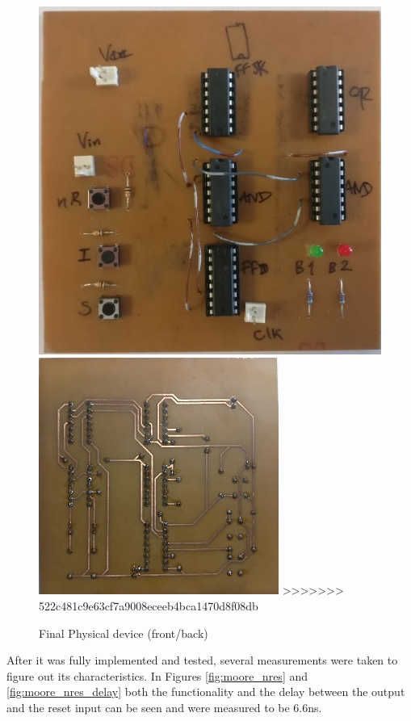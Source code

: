 \begin{figure}[H]
\begin{center}
        \includegraphics[scale=0.5]{./final_build.png}
        \includegraphics[scale=0.85]{./final_back.png}
>>>>>>> 522c481c9e63cf7a9008eceeb4bca1470d8f08db
        \caption{Final Physical device (front/back)}
        \label{fig:moore_build}
    \end{center}
\end{figure}

After it was fully implemented and tested, several measurements were taken to figure out its characteristics.
In Figures \ref{fig:moore_nres} and \ref{fig:moore_nres_delay} both the functionality and the delay between the output
and the reset input can be seen and were measured to be 6.6ns.

